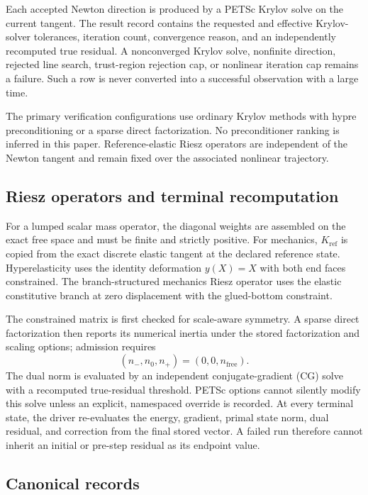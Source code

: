 Each accepted Newton direction is produced by a PETSc Krylov solve on the
current tangent. The result record contains the requested and effective
Krylov-solver tolerances, iteration count, convergence reason, and an
independently recomputed true residual. A nonconverged Krylov solve, nonfinite
direction, rejected line search, trust-region rejection cap, or nonlinear
iteration cap remains a failure. Such a row is never converted into a
successful observation with a large time.

The primary verification configurations use ordinary Krylov methods with
hypre preconditioning or a sparse direct factorization. No preconditioner
ranking is inferred in this paper.
Reference-elastic Riesz operators are independent of the Newton tangent and
remain fixed over the associated nonlinear trajectory.

\subsection{Riesz operators and terminal recomputation}
\label{subsec:riesz-implementation}

For a lumped scalar mass operator, the diagonal weights are assembled on the
exact free space and must be finite and strictly positive. For mechanics,
$K_{\mathrm{ref}}$ is copied from the exact discrete elastic tangent at the
declared reference state. Hyperelasticity uses the identity deformation
$y(X)=X$ with both end faces constrained. The branch-structured mechanics
Riesz operator uses the
elastic constitutive branch at zero displacement with the glued-bottom
constraint.

The constrained matrix is first checked for scale-aware symmetry. A sparse
direct factorization then reports its numerical inertia under the stored
factorization and scaling options; admission requires
\begin{equation}
  (n_-,n_0,n_+)=(0,0,n_{\mathrm{free}}).
  \label{eq:riesz-inertia-gate}
\end{equation}
The dual norm is evaluated by an independent conjugate-gradient (CG) solve with
a recomputed true-residual threshold. PETSc options cannot silently modify this
solve unless an explicit, namespaced override is recorded. At every terminal state, the driver
re-evaluates the energy, gradient, primal state norm, dual residual, and
correction from the final stored vector. A failed run therefore cannot inherit
an initial or pre-step residual as its endpoint value.

\subsection{Canonical records}
\label{subsec:canonical-records}

